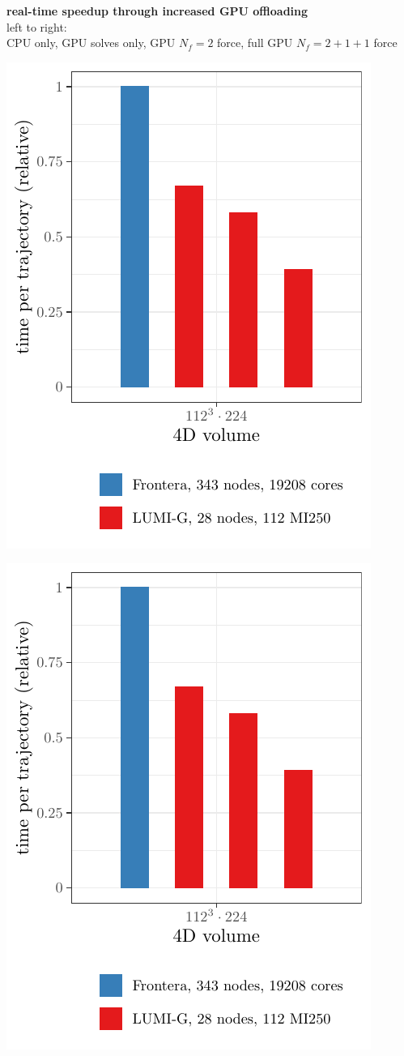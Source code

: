 \documentclass[a0,portrait]{a0poster}
\begin{document}
\begin{multicols}{2}
    \begin{center}
      \textbf{real-time speedup through increased GPU offloading}\\
      left to right:\\
      CPU only, GPU solves only, GPU $N_f=2$ force, full GPU $N_f=2+1+1$ force
    \end{center}
    \vspace{0.5cm}
    \begin{minipage}{0.5\linewidth}
      \centering
      \includegraphics[width=0.65\linewidth,page=2]{data/tmLQCD_performance/quda_speedup}\\
    \end{minipage}
    \begin{minipage}{0.5\linewidth}
      \centering
      \includegraphics[width=0.65\linewidth,page=1]{data/tmLQCD_performance/quda_speedup}\\
    \end{minipage}


\end{multicols}
\end{document}
